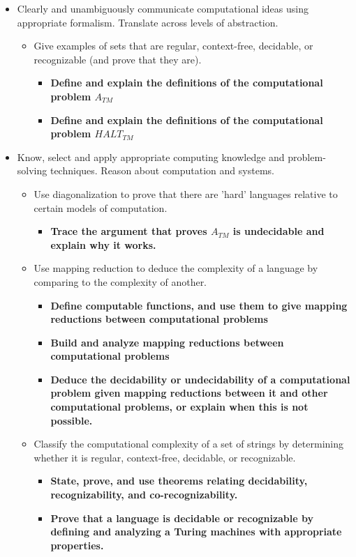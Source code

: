 \documentclass[12pt, oneside]{article}
\begin{document}
\begin{itemize}
    \item Clearly and unambiguously communicate computational ideas using appropriate formalism. Translate across levels of abstraction.
    \begin{itemize}
        \item Give examples of sets that are regular, context-free, decidable, or recognizable (and prove that they are).
        \begin{itemize}
          \item {\bf Define and explain the definitions of the computational problem $A_{TM}$}
          \item {\bf Define and explain the definitions of the computational problem $HALT_{TM}$}
       \end{itemize}
    \end{itemize}
    \item Know, select and apply appropriate computing knowledge and problem-solving techniques. Reason about computation and systems.
    \begin{itemize}
        \item Use diagonalization to prove that there are 'hard' languages relative to certain models of computation.
        \begin{itemize}
            \item {\bf Trace the argument that proves $A_{TM}$ is undecidable and explain why it works.}
        \end{itemize}
        \item Use mapping reduction to deduce the complexity of a language by comparing to the complexity of another.
           \begin{itemize}
              \item {\bf Define computable functions, and use them to give mapping reductions between computational problems}
              \item {\bf Build and analyze mapping reductions between computational problems}
              \item {\bf Deduce the decidability or undecidability of a computational problem given mapping reductions between it and other computational problems, or explain when this is not possible.}
           \end{itemize}
    \item Classify the computational complexity of a set of strings by determining whether it is regular, context-free, decidable, or recognizable.
    \begin{itemize}
    \item {\bf State, prove, and use theorems relating decidability, recognizability, and co-recognizability.}
    \item {\bf Prove that a language is decidable or recognizable by defining and analyzing a Turing machines with appropriate properties.}
\end{itemize}
\end{itemize}
\end{itemize}
\end{document}
